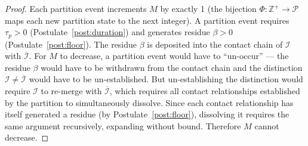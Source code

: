 \begin{proof}
Each partition event increments $M$ by exactly 1 (the bijection
$\Phi: \mathbb{Z}^+ \to \mathcal{P}$ maps each new partition state to the next
integer). A partition event requires $\tau_p > 0$ (Postulate~\ref{post:duration})
and generates residue $\beta > 0$ (Postulate~\ref{post:floor}). The residue
$\beta$ is deposited into the contact chain of $\mathcal{I}$ with
$\overline{\mathcal{I}}$. For $M$ to decrease, a partition event would have to
``un-occur'' --- the residue $\beta$ would have to be withdrawn from the contact
chain and the distinction $\mathcal{I} \neq \overline{\mathcal{I}}$ would have
to be un-established. But un-establishing the distinction would require
$\mathcal{I}$ to re-merge with $\overline{\mathcal{I}}$, which requires all
contact relationships established by the partition to simultaneously dissolve.
Since each contact relationship has itself generated a residue (by
Postulate~\ref{post:floor}), dissolving it requires the same argument
recursively, expanding without bound. Therefore $M$ cannot decrease.
\end{proof}
